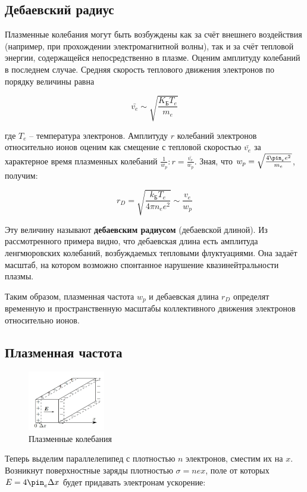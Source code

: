 \documentclass[11pt]{article}
\begin{document}
\subsection*{Дебаевский радиус}

 Плазменные колебания могут быть возбуждены как за счёт внешнего воздействия (например, при прохождении электромагнитной волны), так и за счёт тепловой энергии, содержащейся непосредственно в плазме. Оценим амплитуду колебаний в последнем случае. Средняя скорость теплового движения электронов по порядку величины равна

\[ \bar{v_e} \sim \sqrt{\frac{K_{Б}T_e}{m_e}}\]


 где $T_e$ -- температура электронов. Амплитуду $r$ колебаний электронов относительно ионов оценим как смещение с тепловой скоростью $\bar{v_e}$ за характерное время плазменных колебаний $\frac{1}{w_p}: r = \frac{\bar{v_e}}{w_p}$. Зная, что $w_p = \sqrt{\frac{4\pin_e e^2}{m_e}}$, получим:
    
\[r_D = \sqrt{\frac{k_{Б}T_e}{4\pi n_e e^2}} \sim \frac{v_e}{w_p}\]

    Эту величину называют \textbf{дебаевским радиусом} (дебаевской длиной). Из рассмотренного примера видно, что дебаевская длина есть амплитуда ленгмюровских колебаний, возбуждаемых тепловыми флуктуациями. Она задаёт масштаб, на котором возможно спонтанное нарушение квазинейтральности плазмы.

    Таким образом, плазменная частота $w_p$ и дебаевская длина $r_D$ определят временную и пространственную масштабы коллективного движения электронов относительно ионов.


\subsection*{Плазменная частота}

\begin{figure}[H]
    \centering
    \includegraphics[width=0.3\textwidth]{plch_351.jpg}
    \caption{Плазменные колебания}
    \label{spec_1}
\end{figure}


    Теперь выделим параллелепипед с плотностью $n$ электронов, сместим их на $x$. Возникнут поверхностные заряды плотностью $\sigma = nex$, поле от которых $E = 4\pin_e \Delta x$ будет придавать электронам ускорение:
\end{document}
